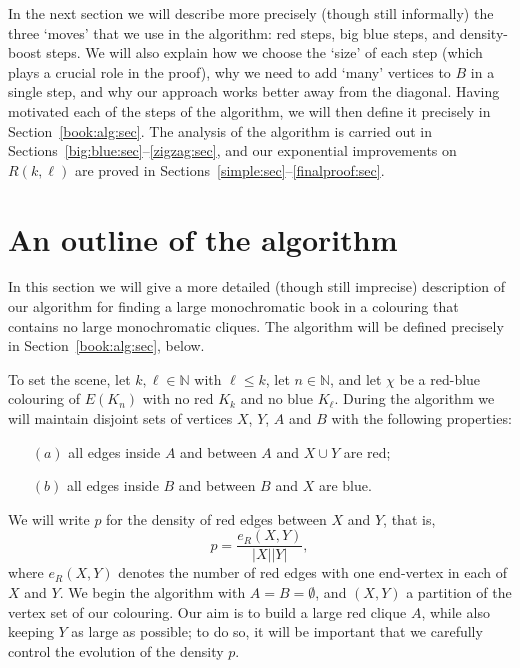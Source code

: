 \documentclass[12pt,reqno]{amsart}
\theoremstyle{definition}
\theoremstyle{remark}
\newcommand\N{\mathbb{N}}
\renewcommand{\le}{\leqslant}
\def\N{\mathbb{N}}
\begin{document}
In the next section we will describe more precisely (though still informally) the three `moves' that we use in the algorithm: red steps, big blue steps, and density-boost steps. We will also explain how we choose the `size' of each step (which plays a crucial role in the proof), why we need to add `many' vertices to $B$ in a single step, and why our approach works better away from the diagonal. Having motivated each of the steps of the algorithm, we will then define it precisely in Section~\ref{book:alg:sec}. The analysis of the algorithm is carried out in Sections~\ref{big:blue:sec}--\ref{zigzag:sec}, and our exponential improvements on $R(k,\ell)$ are proved in Sections~\ref{simple:sec}--\ref{finalproof:sec}.


\section{An outline of the algorithm}\label{outline:sec}

In this section we will give a more detailed (though still imprecise) description of our algorithm for finding a large monochromatic book in a colouring that contains no large monochromatic cliques. The algorithm will be defined precisely in Section~\ref{book:alg:sec}, below.

To set the scene, let $k,\ell \in \N$ with $\ell \le k$, let $n \in \N$, and let $\chi$ be a red-blue colouring of $E(K_n)$ with no red $K_k$ and no blue $K_\ell$. During the algorithm we will maintain disjoint sets of vertices $X$, $Y$, $A$ and $B$ with the following properties:
\begin{itemize}
\item[$(a)$] all edges inside $A$ and between $A$ and $X \cup Y$ are red;\smallskip
\item[$(b)$] all edges inside $B$ and between $B$ and $X$ are blue.
\end{itemize}
We will write $p$ for the density of red edges between $X$ and $Y$, that is,
$$p = \frac{e_R(X,Y)}{|X||Y|},$$
where $e_R(X,Y)$ denotes the number of red edges with one end-vertex in each of $X$ and $Y$. We begin the algorithm with $A = B = \emptyset$, and $(X,Y)$ a partition of the vertex set of our colouring. Our aim is to build a large red clique $A$, while also keeping $Y$ as large as possible; to do so, it will be important that we carefully control the evolution of the density $p$. 
\end{document}
